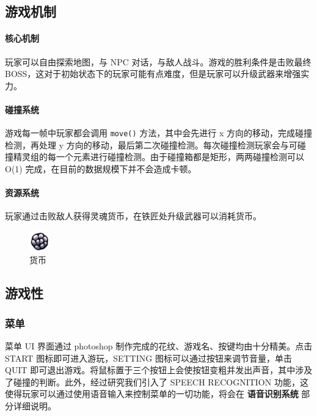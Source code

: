 \documentclass[12pt, twoside, a4paper]{article}
\newcommand{\inlinecode}[1]{\setlength{\fboxsep}{0.8mm} \colorbox{lightgray!40}{\texttt{#1}}}
\begin{document}
\subsection{游戏机制}

\paragraph{核心机制} 玩家可以自由探索地图，与 NPC 对话，与敌人战斗。游戏的胜利条件是击败最终 BOSS，这对于初始状态下的玩家可能有点难度，但是玩家可以升级武器来增强实力。

\paragraph{碰撞系统} 游戏每一帧中玩家都会调用 \inlinecode{move()} 方法，其中会先进行 x 方向的移动，完成碰撞检测，再处理 y 方向的移动，最后第二次碰撞检测。每次碰撞检测玩家会与可碰撞精灵组的每一个元素进行碰撞检测。由于碰撞箱都是矩形，两两碰撞检测可以 O(1) 完成，在目前的数据规模下并不会造成卡顿。

\paragraph{资源系统} 玩家通过击败敌人获得灵魂货币，在铁匠处升级武器可以消耗货币。

\begin{figure}[h!]
    \centering
    \includegraphics[width=0.08\textwidth]{assets/report/coin.png}
    \caption{货币}
\end{figure}

\subsection{游戏性}

\subsubsection{菜单}

菜单 UI 界面通过 photoshop 制作完成的花纹、游戏名、按键均由十分精美。点击 START 图标即可进入游玩，SETTING 图标可以通过按钮来调节音量，单击 QUIT 即可退出游戏。将鼠标置于三个按钮上会使按钮变粗并发出声音，其中涉及了碰撞的判断。此外，经过研究我们引入了 SPEECH RECOGNITION 功能，这使得玩家可以通过使用语音输入来控制菜单的一切功能，将会在 \textbf{语音识别系统} 部分详细说明。
\end{document}
